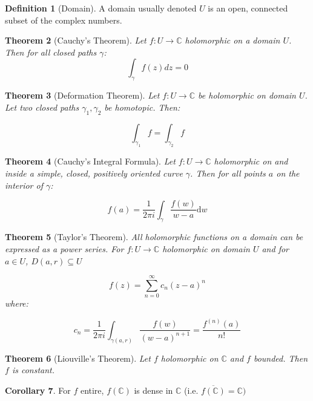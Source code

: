 \documentclass[11pt,a4paper, titlepage]{article}
\newtheorem{theorem}{Theorem}[section]
\theoremstyle{definition}
\newtheorem{definition}[theorem]{Definition}
\newtheorem{corollary}[theorem]{Corollary}
\begin{document}
\begin{definition}[Domain]
A domain usually denoted $U$ is an open, connected subset of the complex numbers.
\end{definition}

\begin{theorem}[Cauchy's Theorem]

Let $f \colon U \longrightarrow \mathbb{C}$ holomorphic on a domain $U$. Then for all closed paths $\gamma$:
\[
	\int_\gamma f(z) dz = 0
\]

\end{theorem}

\begin{theorem}[Deformation Theorem]

Let $f \colon U \longrightarrow \mathbb{C}$ be holomorphic on domain $U$. Let two closed paths $\gamma_1, \gamma_2 $ be homotopic. Then:

\[
	\int_{\gamma_1} f = \int_{\gamma_2} f
\]	

\end{theorem}

\begin{theorem}[Cauchy's Integral Formula]

Let $f \colon U \longrightarrow \mathbb{C}$ holomorphic on and inside a simple, closed, positively oriented curve $\gamma$. Then for all points $a$ on the interior of $\gamma$:

\[
	f(a) = \frac{1}{2\pi i} \int_\gamma \frac{f(w)}{w-a} \mathrm{d}w
\]	

\end{theorem}

\begin{theorem}[Taylor's Theorem]

All holomorphic functions on a domain can be expressed as a power series. For $f \colon U \longrightarrow \mathbb{C}$ holomorphic on domain $U$ and for $a \in U$, $D(a,r) \subseteq U$

\[
	f(z) = 	\sum_{n=0}^\infty c_n (z-a)^n
\]
where:

\[
	c_n = \frac{1}{2 \pi i} \int_{\gamma(a,r)} \frac{f(w)}{(w-a)^{n+1}} = \frac{f^{(n)}(a)}{n!}
\]
\end{theorem}


\begin{theorem}[Liouville's Theorem]
Let $f$ holomorphic on $\mathbb{C}$ and $f$ bounded. Then $f$ is constant.
\end{theorem}

\begin{corollary}
For $f$ entire, $f(\mathbb{C})$ is dense in $\mathbb{C}$ (i.e. $\overline {f(\mathbb{C})} = \mathbb{C})$
\end{corollary}
\end{document}

